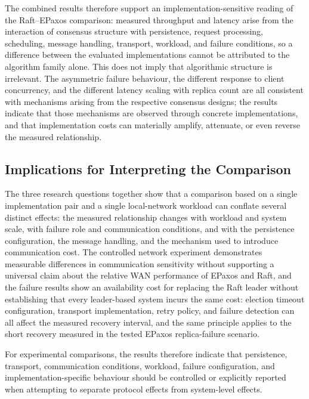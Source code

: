 The combined results therefore support an implementation-sensitive reading
of the Raft--EPaxos comparison: measured throughput and latency arise from
the interaction of consensus structure with persistence, request processing,
scheduling, message handling, transport, workload, and failure conditions,
so a difference between the evaluated implementations cannot be attributed
to the algorithm family alone. This does not imply that algorithmic
structure is irrelevant. The asymmetric failure behaviour, the different
response to client concurrency, and the different latency scaling with
replica count are all consistent with mechanisms arising from the respective
consensus designs; the results indicate that those mechanisms are observed
through concrete implementations, and that implementation costs can
materially amplify, attenuate, or even reverse the measured relationship.

\subsection{Implications for Interpreting the Comparison}

The three research questions together show that a comparison based on a
single implementation pair and a single local-network workload can conflate
several distinct effects: the measured relationship changes with workload and
system scale, with failure role and communication conditions, and with the
persistence configuration, the message handling, and the mechanism used to
introduce communication cost. The controlled network experiment demonstrates
measurable differences in communication sensitivity without supporting a
universal claim about the relative WAN performance of EPaxos and Raft, and
the failure results show an availability cost for replacing the Raft leader
without establishing that every leader-based system incurs the same cost:
election timeout configuration, transport implementation, retry policy, and
failure detection can all affect the measured recovery interval, and the same
principle applies to the short recovery measured in the tested EPaxos
replica-failure scenario.

For experimental comparisons, the results therefore indicate that
persistence, transport, communication conditions, workload, failure
configuration, and implementation-specific behaviour should be controlled
or explicitly reported when attempting to separate protocol effects from
system-level effects.
